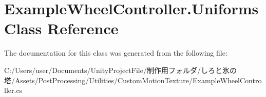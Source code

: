 \hypertarget{class_example_wheel_controller_1_1_uniforms}{}\section{Example\+Wheel\+Controller.\+Uniforms Class Reference}
\label{class_example_wheel_controller_1_1_uniforms}


The documentation for this class was generated from the following file\+:\begin{DoxyCompactItemize}
\item 
C\+:/\+Users/user/\+Documents/\+Unity\+Project\+File/制作用フォルダ/しろと氷の塔/\+Assets/\+Post\+Processing/\+Utilities/\+Custom\+Motion\+Texture/Example\+Wheel\+Controller.\+cs\end{DoxyCompactItemize}
